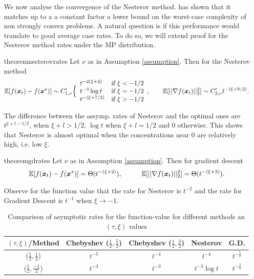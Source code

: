 \documentclass{article}
\begin{document}
We now analyse the convergence of the Nesterov method. \cite{nesterov2003introductory} has shown that it matches up to a a constant factor a lower bound on the worst-case complexity of non strongly convex problems. A natural question is if this performance would translate to good average case rates. To do so, we will extend \citet{paquette2020halting} proof for the Nesterov method rates under the MP distribution.  
\begin{restatable}{theorem}{nesterovrates} \label{the: neste rates}
Let $\nu$ as in Assumption \ref{assumption}. Then for the Nesterov method
\begin{equation}
    \mathbb{E}[f({\boldsymbol x}_t)-f({\boldsymbol x}^\star)]\sim C'_{1,\nu}
    \Big\{\begin{array}{ll}
		  t^{-2(\xi+2)}& \mbox{if } 
		  \xi<-1/2\\
		  t^{-3}\log t& \mbox{if } 
		  \xi=-1/2\\
		  t^{-(\xi+7/2)}& \mbox{if } 
		  \xi>-1/2
	\end{array}, \qquad 
	\mathbb{E}[||\nabla f({\boldsymbol x}_t)||^2_2] \sim C'_{2,\nu}
		  t^{-(\xi+9/2)}.
\end{equation}
\end{restatable}

The difference between the assymp. rates of Nesterov and the optimal ones are $t^{\xi+l-1/2}$, when $\xi+l>1/2$, $\log t$ when $\xi+l=1/2$ and $0$ otherwise.
This shows that Nesterov is almost optimal when the concentrations near $0$ are relatively high, i.e. low $\xi$.

\begin{restatable}{theorem}{gdrates} \label{the: gd rates}
Let $\nu$ as in Assumption \ref{assumption}. Then for gradient descent
\begin{equation}
\mathbb{E}[f({\boldsymbol x}_t)-f({\boldsymbol x}^\star)]=\Theta(t^{-(\xi+2)}), \hspace{1 cm}
	\mathbb{E}[||\nabla f({\boldsymbol x}_t)||^2_2] =\Theta(t^{-(\xi+3)}).
\end{equation}

\end{restatable}

Observe for the function value that the rate for Nesterov is $t^{-2}$ and the rate for Gradient Descent is $t^{-1}$ when $\xi \rightarrow -1$. 

\begin{table}[t]
    \centering
    \begin{tabular}{c|c|c|c|c}
         $(\tau,\xi)$/Method& Chebyshev ($\frac{1}{2},\frac{5}{2}$) & Chebyshev ($\frac{1}{2},\frac{3}{2}$) &  Nesterov  & G.D. \\
         \hline
         ($\frac{1}{2},\frac{1}{2}$)&$t^{-5}$ & $t^{-4}$ & $t^{-4}$ & $t^{-\frac{5}{2}}$\\
         \hline
         ($\frac{1}{2},\frac{-1}{2}$)&$t^{-3}$ & $t^{-3}$ & $t^{-3}\log t$ & $t^{-\frac{3}{2}}$
    \end{tabular}
    \caption{Comparison of asymptotic rates for the function-value for different methods an $(\tau,\xi)$ values}
    \label{tab:theoretic rates}
\end{table}
\end{document}
